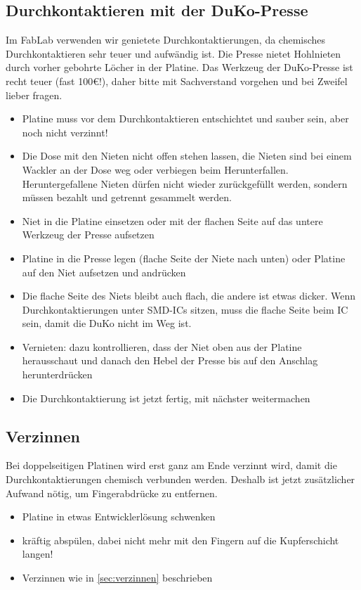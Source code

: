 \documentclass{\basedir/fablab-document}
\begin{document}
\subsection{Durchkontaktieren mit der DuKo-Presse}
Im FabLab verwenden wir genietete Durchkontaktierungen, da chemisches Durchkontaktieren sehr teuer und aufwändig ist. Die Presse nietet Hohlnieten durch vorher gebohrte Löcher in der Platine. Das Werkzeug der DuKo-Presse ist recht teuer (fast 100€!), daher bitte mit Sachverstand vorgehen und bei Zweifel lieber fragen.
\begin{itemize}
\item Platine muss vor dem Durchkontaktieren entschichtet und sauber sein, aber noch nicht verzinnt!
\item Die Dose mit den Nieten nicht offen stehen lassen, die Nieten sind bei einem Wackler an der Dose weg oder verbiegen beim Herunterfallen. Heruntergefallene Nieten dürfen nicht wieder zurückgefüllt werden, sondern müssen bezahlt und getrennt gesammelt werden.
\item Niet in die Platine einsetzen oder mit der flachen Seite auf das untere Werkzeug der Presse aufsetzen
\item Platine in die Presse legen (flache Seite der Niete nach unten) oder Platine auf den Niet aufsetzen und andrücken
\item Die flache Seite des Niets bleibt auch flach, die andere ist etwas dicker. Wenn Durchkontaktierungen unter SMD-ICs sitzen, muss die flache Seite beim IC sein, damit die DuKo nicht im Weg ist.
\item Vernieten: dazu kontrollieren, dass der Niet oben aus der Platine herausschaut und danach den Hebel der Presse bis auf den Anschlag herunterdrücken
\item Die Durchkontaktierung ist jetzt fertig, mit nächster weitermachen
\end{itemize}

\subsection{Verzinnen}
Bei doppelseitigen Platinen wird erst ganz am Ende verzinnt wird, damit die Durchkontaktierungen chemisch verbunden werden. Deshalb ist jetzt zusätzlicher Aufwand nötig, um Fingerabdrücke zu entfernen.
\begin{itemize}
 \item Platine in etwas Entwicklerlösung schwenken
 \item kräftig abspülen, dabei nicht mehr mit den Fingern auf die Kupferschicht langen!
 \item Verzinnen wie in \ref{sec:verzinnen} beschrieben
\end{itemize}
\end{document}
